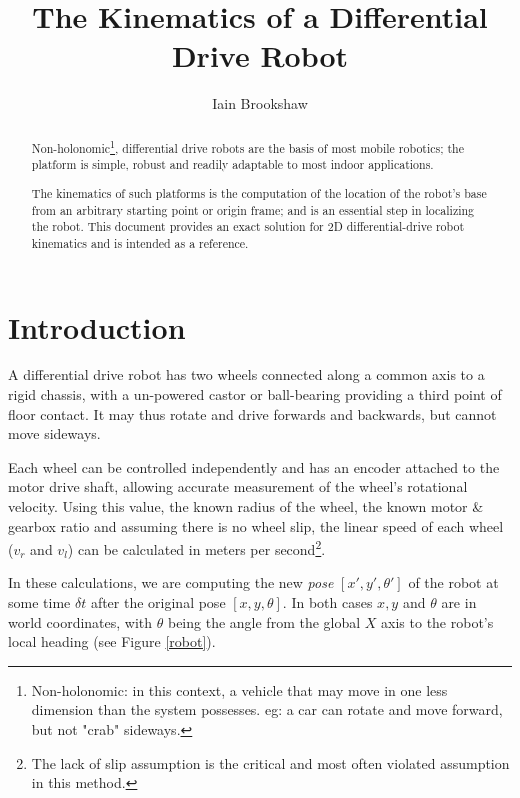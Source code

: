 \documentclass[11pt]{article}
\title{The Kinematics of a Differential Drive Robot}
\author{Iain Brookshaw}
\begin{document}
\maketitle
\begin{abstract}
    Non-holonomic\footnote{Non-holonomic: in this context, a vehicle that may move in one less dimension than the 
    system possesses. eg: a car can rotate and move forward, but not "crab" sideways.}, differential drive robots are 
    the basis of most mobile robotics; the platform is simple, robust and readily adaptable
    to most indoor applications.

    The kinematics of such platforms is the computation of the location of the robot's base
    from an arbitrary starting point or origin frame; and is an essential step in localizing the robot.
    This document provides an exact solution for 2D differential-drive robot kinematics and is intended as a reference.
\end{abstract}

\section{Introduction}

A differential drive robot has two wheels connected along a common axis to a rigid chassis, with a un-powered castor
or ball-bearing providing a third point of floor contact. It may thus rotate and drive forwards and backwards, but 
cannot move sideways.

Each wheel can be controlled  independently and has an encoder attached to the motor drive shaft, allowing accurate 
measurement of the wheel's rotational velocity. Using this value, the known radius of the wheel, the known motor 
\& gearbox ratio and assuming there is no wheel slip, the linear speed of each wheel ($v_r$ and $v_l$) can be
calculated in meters per second\footnote{The lack of slip assumption is the critical and most often violated 
assumption in this method.}.

In these calculations, we are computing the new {\em pose} $[x',y',\theta']$ of the robot at some time $\delta t$ after
the original pose $[x,y,\theta]$. In both cases $x,y$ and $\theta$ are in world coordinates, with $\theta$ being the 
angle from the global $X$ axis to the robot's local heading (see Figure \ref{robot}).
\end{document}
